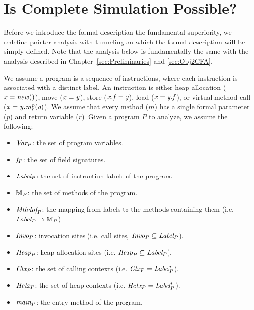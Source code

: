 
\chapter{Is Complete Simulation Possible?}\label{sec:appendix}
Before we introduce the formal description the fundamental superiority, we redefine pointer analysis with tunneling on which the formal description will be simply defined. Note that the analysis below is fundamentally the same with the analysis described in Chapter~\ref{sec:Preliminaries} and \ref{sec:Obj2CFA}.



\label{sec:pointeranalysis}


We assume a program is a sequence of instructions, where each
instruction is associated with a distinct label.  An instruction is
either heap allocation (${\it x = new()}$), move (${\it x = y}$), 
store (${\it x.f = y}$), load (${\it x = y.f}$),
or
virtual method call (${\it x = y.m_r^{p}(a)}$).  We
assume that every method ($m$) has a single formal parameter ($p$) and
return variable ($r$). 
Given a program $P$ to analyze, we assume the following:
\begin{itemize}[leftmargin=1.4em]
\item $\text{\it Var}_P$: the set of program variables.
\item ${\it f}_P$: the set of field signatures.
\item $\text{\it Label}_P$: the set of instruction labels of the program.
\item ${\mathbb{M}}_P$: the set of methods of the program.
\item $\text{\it Mthdof}_P$: the mapping from labels to the
methods containing them (i.e. $\text{\it Label}_P \to {\mathbb{M}}_P$).
\item $\text{\it Invo}_P$: invocation sites (i.e. call sites, $\text{\it Invo}_P \subseteq \text{\it Label}_P$).
\item $\text{\it Heap}_P$: heap allocation sites (i.e. $\text{\it Heap}_P \subseteq \text{\it Label}_P$).
\item $\text{\it Ctx}_P$: the set of calling contexts (i.e. $\text{\it Ctx}_P = \text{\it Label}_P^*$).
\item $\text{\it Hctx}_P$: the set of heap contexts (i.e. $\text{\it Hctx}_P = \text{\it Label}_P^*$).
\item $\text{\it main}_P$: the entry method of the program.
\end{itemize}


